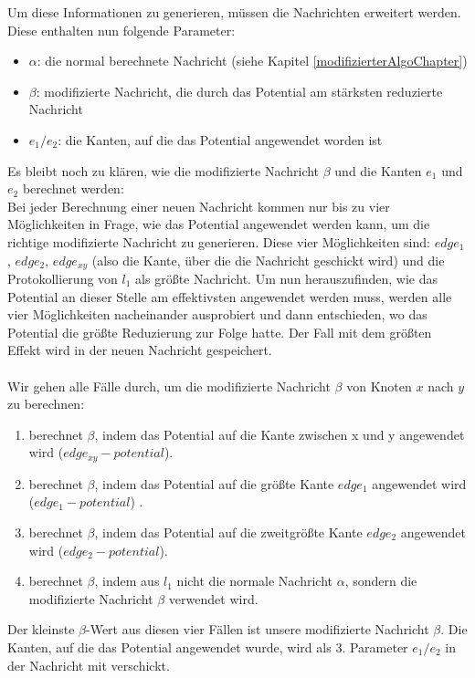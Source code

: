 	Um diese Informationen zu generieren, müssen die Nachrichten erweitert werden.
	Diese enthalten nun folgende Parameter:
	\begin{itemize}
		\item $\alpha$: die normal berechnete Nachricht (siehe Kapitel \ref{modifizierterAlgoChapter})
		\item $\beta$: modifizierte Nachricht, die durch das Potential am stärksten reduzierte Nachricht
		\item $e_{1} / e_{2}$: die Kanten, auf die das Potential angewendet worden ist
	\end{itemize}
	Es bleibt noch zu klären, wie die modifizierte Nachricht $\beta$ und die Kanten $e_{1}$ und $e_{2}$ berechnet werden:\\
	Bei jeder Berechnung einer neuen Nachricht kommen nur bis zu vier Möglichkeiten in Frage, wie das Potential angewendet werden kann, um die richtige modifizierte Nachricht zu generieren. Diese vier Möglichkeiten sind: $edge_{1}$, $edge_{2}$, $edge_{xy}$ (also die Kante, über die die Nachricht geschickt wird) und die Protokollierung von $l_{1}$ als größte Nachricht. Um nun herauszufinden, wie das Potential an dieser Stelle am effektivsten angewendet werden muss, werden alle vier Möglichkeiten nacheinander ausprobiert und dann entschieden, wo das Potential die größte Reduzierung zur Folge hatte. Der Fall mit dem größten Effekt wird in der neuen Nachricht gespeichert.
	\\
	\\
	Wir gehen alle Fälle durch, um die modifizierte Nachricht $\beta$ von Knoten $x$ nach $y$ zu berechnen:
	\begin{enumerate}
		\item berechnet $\beta$, indem das Potential auf die Kante zwischen x und y angewendet wird ($edge_{xy} - potential$).
		\item berechnet $\beta$, indem das Potential auf die größte Kante $edge_{1}$ angewendet wird ($edge_{1} - potential$) .
		\item berechnet $\beta$, indem das Potential auf die zweitgrößte Kante $edge_{2}$ angewendet wird ($edge_{2} - potential$).
		\item berechnet $\beta$, indem aus $l_{1}$ nicht die normale Nachricht $\alpha$, sondern die modifizierte Nachricht $\beta$ verwendet wird.
	\end{enumerate}
	Der kleinste $\beta$-Wert aus diesen vier Fällen ist unsere modifizierte Nachricht $\beta$. Die Kanten, auf die das Potential angewendet wurde, wird als 3. Parameter $e_{1} / e_{2}$ in der Nachricht mit verschickt.\\
